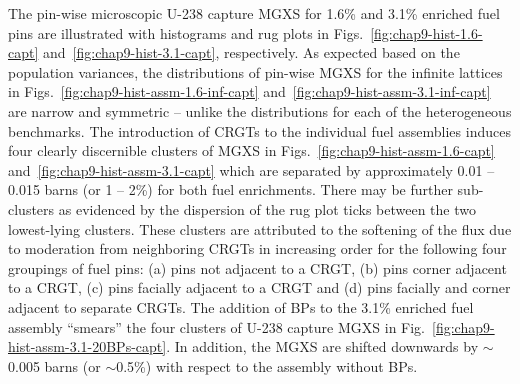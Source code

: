 The pin-wise microscopic U-238 capture \ac{MGXS} for 1.6\% and 3.1\% enriched fuel pins are illustrated with histograms and rug plots in Figs.~\ref{fig:chap9-hist-1.6-capt} and~\ref{fig:chap9-hist-3.1-capt}, respectively. As expected based on the population variances, the distributions of pin-wise \ac{MGXS} for the infinite lattices in Figs.~\ref{fig:chap9-hist-assm-1.6-inf-capt} and~\ref{fig:chap9-hist-assm-3.1-inf-capt} are narrow and symmetric -- unlike the distributions for each of the heterogeneous benchmarks. The introduction of \acp{CRGT} to the individual fuel assemblies induces four clearly discernible clusters of \ac{MGXS} in Figs.~\ref{fig:chap9-hist-assm-1.6-capt} and~\ref{fig:chap9-hist-assm-3.1-capt} which are separated by approximately 0.01 -- 0.015 barns (or 1 -- 2\%) for both fuel enrichments. There may be further sub-clusters as evidenced by the dispersion of the rug plot ticks between the two lowest-lying clusters. These clusters are attributed to the softening of the flux due to moderation from neighboring \acp{CRGT} in increasing order for the following four groupings of fuel pins: (a) pins not adjacent to a \ac{CRGT}, (b) pins corner adjacent to a \ac{CRGT}, (c) pins facially adjacent to a \ac{CRGT} and (d) pins facially and corner adjacent to separate \acp{CRGT}. The addition of \acp{BP} to the 3.1\% enriched fuel assembly ``smears'' the four clusters of U-238 capture \ac{MGXS} in Fig.~\ref{fig:chap9-hist-assm-3.1-20BPs-capt}. In addition, the \ac{MGXS} are shifted downwards by $\sim$0.005 barns (or $\sim$0.5\%) with respect to the assembly without \acp{BP}.

